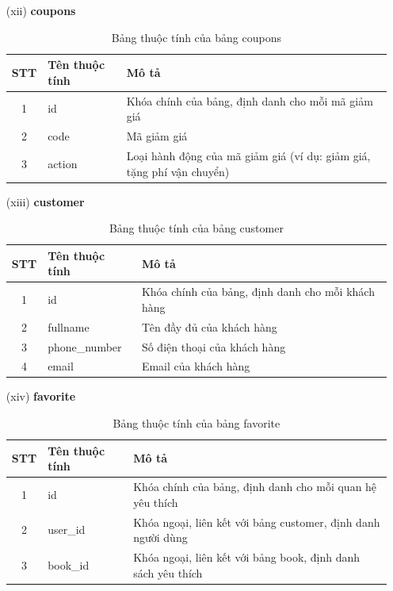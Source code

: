 \documentclass[../DoAn.tex]{subfiles}
\begin{document}
\begin{enumerate}
    \item[(xii)] \textbf{coupons}
    \begin{table}[H]
    \centering
        \begin{tabular}{|c|m{4cm}|m{8cm}|}
        \hline
        \textbf{STT} & \textbf{Tên thuộc tính} & \textbf{Mô tả} \\
        \hline
        1 & id & Khóa chính của bảng, định danh cho mỗi mã giảm giá \\
        \hline
        2 & code & Mã giảm giá \\
        \hline
        3 & action & Loại hành động của mã giảm giá (ví dụ: giảm giá, tặng phí vận chuyển) \\
        \hline
        \end{tabular}
        \caption{Bảng thuộc tính của bảng coupons}
        \label{tab:coupons_attributes}
    \end{table}

    \item[(xiii)] \textbf{customer}
    \begin{table}[H]
    \centering
    \begin{tabular}{|c|m{4cm}|m{8cm}|}
        \hline
        \textbf{STT} & \textbf{Tên thuộc tính} & \textbf{Mô tả} \\
        \hline
        1 & id & Khóa chính của bảng, định danh cho mỗi khách hàng \\
        \hline
        2 & fullname & Tên đầy đủ của khách hàng \\
        \hline
        3 & phone\_number & Số điện thoại của khách hàng \\
        \hline
        4 & email & Email của khách hàng \\
        \hline
        \end{tabular}
        \caption{Bảng thuộc tính của bảng customer}
        \label{tab:customer_attributes}
    \end{table}

    \item[(xiv)] \textbf{favorite}
    \begin{table}[H]
    \centering
        \begin{tabular}{|c|m{4cm}|m{8cm}|}
        \hline
        \textbf{STT} & \textbf{Tên thuộc tính} & \textbf{Mô tả} \\
        \hline
        1 & id & Khóa chính của bảng, định danh cho mỗi quan hệ yêu thích \\
        \hline
        2 & user\_id & Khóa ngoại, liên kết với bảng customer, định danh người dùng \\
        \hline
        3 & book\_id & Khóa ngoại, liên kết với bảng book, định danh sách yêu thích \\
        \hline
        \end{tabular}
        \caption{Bảng thuộc tính của bảng favorite}
        \label{tab:favorite_attributes}
    \end{table}


\end{enumerate}
\end{document}
